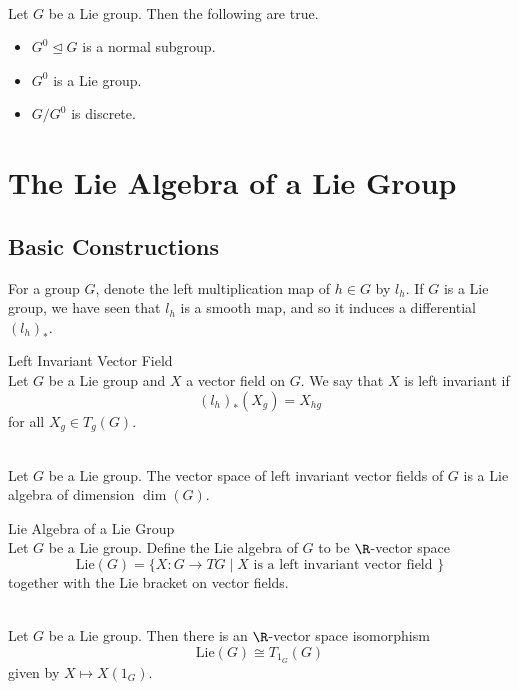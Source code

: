 \documentclass[a4paper]{article}
\begin{document}
\begin{lmm}{}{}\\
Let $G$ be a Lie group. Then the following are true. 
\begin{itemize}
\item $G^0\trianglelefteq G$ is a normal subgroup. 
\item $G^0$ is a Lie group. 
\item $G/G^0$ is discrete. 
\end{itemize}
\end{lmm}

\pagebreak
\section{The Lie Algebra of a Lie Group}
\subsection{Basic Constructions}
For a group $G$, denote the left multiplication map of $h\in G$ by $l_h$. If $G$ is a Lie group, we have seen that $l_h$ is a smooth map, and so it induces a differential $(l_h)_\ast$. 

\begin{defn}{Left Invariant Vector Field}{} \\Let $G$ be a Lie group and $X$ a vector field on $G$. We say that $X$ is left invariant if $$(l_h)_\ast(X_g)=X_{hg}$$ for all $X_g\in T_g(G)$. 
\end{defn}

\begin{prp}{}{} \\Let $G$ be a Lie group. The vector space of left invariant vector fields of $G$ is a Lie algebra of dimension $\dim(G)$. 
\end{prp}

\begin{defn}{Lie Algebra of a Lie Group}{}\\
Let $G$ be a Lie group. Define the Lie algebra of $G$ to be $\R$-vector space $$\text{Lie}(G)=\{X:G\to TG\;|\;X\text{ is a left invariant vector field }\}$$ together with the Lie bracket on vector fields. 
\end{defn}

\begin{prp}{}{}\\
Let $G$ be a Lie group. Then there is an $\R$-vector space isomorphism $$\text{Lie}(G)\cong T_{1_G}(G)$$ given by $X\mapsto X(1_G)$. 
\end{prp}
\end{document}
